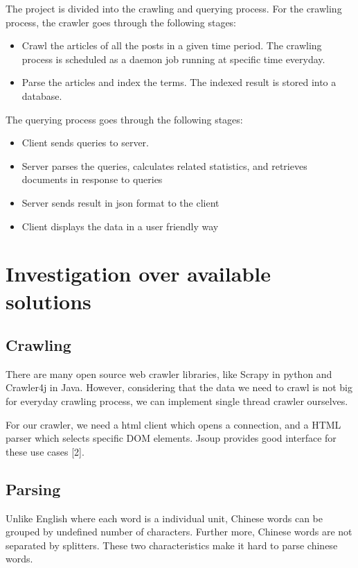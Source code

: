 \documentclass{article}
\begin{document}
The project is divided into the crawling and querying process. For the crawling process, the crawler goes through the following stages:

\begin{itemize}
  \item Crawl the articles of all the posts in a given time period. The crawling process is scheduled as a daemon job running at specific time everyday. 
  \item Parse the articles and index the terms. The indexed result is stored into a database.
\end{itemize}

The querying process goes through the following stages:

\begin{itemize}
  \item Client sends queries to server.
  \item Server parses the queries, calculates related statistics, and retrieves documents in response to queries
  \item Server sends result in json format to the client
  \item Client displays the data in a user friendly way
\end{itemize}

\section{Investigation over available solutions}
\subsection{Crawling}
There are many open source web crawler libraries, like Scrapy in python and Crawler4j in Java. However, considering that the data we need to crawl is not big for everyday crawling process, we can implement single thread crawler ourselves.

For our crawler, we need a html client which opens a connection, and a HTML parser which selects specific DOM elements. Jsoup provides good interface for these use cases [2].

\subsection{Parsing}
Unlike English where each word is a individual unit, Chinese words can be grouped by undefined number of characters. Further more, Chinese words are not separated by splitters. These two characteristics make it hard to parse chinese words.
\end{document}

